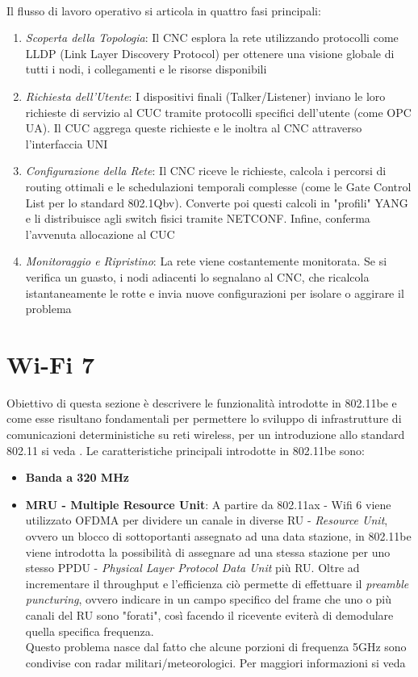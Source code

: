 \documentclass[12pt,a4paper,twoside]{book}
\begin{document}
\begin{onehalfspace}
\\
Il flusso di lavoro operativo si articola in quattro fasi principali:
\begin{enumerate}
    \item \emph{Scoperta della Topologia}: Il CNC esplora la rete utilizzando protocolli come LLDP (Link Layer Discovery Protocol) per ottenere una visione globale di tutti i nodi, i collegamenti e le risorse disponibili
    \item \emph{Richiesta dell'Utente}: I dispositivi finali (Talker/Listener) inviano le loro richieste di servizio al CUC tramite protocolli specifici dell'utente (come OPC UA). Il CUC aggrega queste richieste e le inoltra al CNC attraverso l'interfaccia UNI
    \item \emph{Configurazione della Rete}: Il CNC riceve le richieste, calcola i percorsi di routing ottimali e le schedulazioni temporali complesse (come le Gate Control List per lo standard 802.1Qbv). Converte poi questi calcoli in "profili" YANG e li distribuisce agli switch fisici tramite NETCONF. Infine, conferma l'avvenuta allocazione al CUC
    \item \emph{Monitoraggio e Ripristino}: La rete viene costantemente monitorata. Se si verifica un guasto, i nodi adiacenti lo segnalano al CNC, che ricalcola istantaneamente le rotte e invia nuove configurazioni per isolare o aggirare il problema
\end{enumerate}
\section{Wi-Fi 7}
\label{sec: wifi7}
Obiettivo di questa sezione è descrivere le funzionalità introdotte in 802.11be e come esse risultano fondamentali per permettere lo sviluppo di infrastrutture di comunicazioni deterministiche su reti wireless, per un introduzione allo standard 802.11 si veda \cite{80211overview}.
Le caratteristiche principali introdotte in 802.11be sono:
\begin{itemize}
    \item \textbf{Banda a 320 MHz}
    \item \textbf{MRU -  Multiple Resource Unit}: A partire da 802.11ax - Wifi 6 viene utilizzato OFDMA per dividere un canale in diverse RU - \textit{Resource Unit}, ovvero un blocco di sottoportanti assegnato ad una data stazione, in 802.11be viene introdotta la possibilità di assegnare ad una stessa stazione per uno stesso  PPDU - \textit{Physical Layer Protocol Data Unit} più RU.
    Oltre ad incrementare il throughput e l'efficienza ciò permette di effettuare il \textit{preamble puncturing}, ovvero indicare in un campo specifico del frame che uno o più canali del RU sono "forati", così facendo il ricevente eviterà di demodulare quella specifica frequenza.
    \\
    Questo problema nasce dal fatto che alcune porzioni di frequenza 5GHz sono condivise con radar militari/meteorologici. Per maggiori informazioni si veda \cite{wifi7_punc}


\end{itemize}
\end{onehalfspace}
\end{document}

